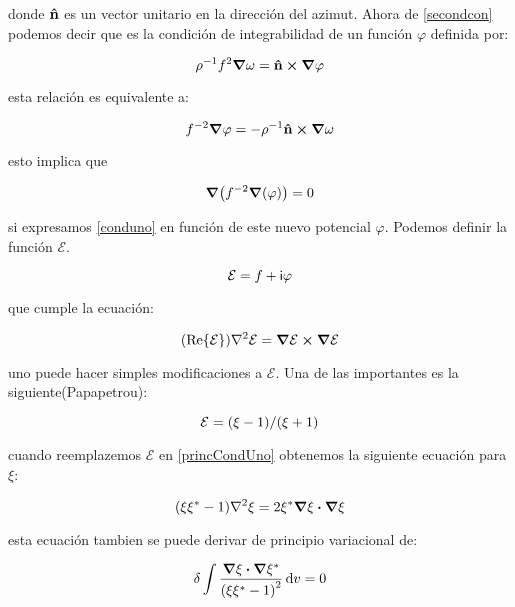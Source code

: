 \documentclass[../Main.tex]{subfiles}
\begin{document}
donde $\vu{n}$ es un vector unitario en la dirección del azimut. Ahora de \eqref{secondcon} podemos decir que es la condición de integrabilidad de un función $\varphi$ definida por:

\begin{equation}
    \rho^{-1}f^{2}\grad{\omega}=\vu{n}\cp\grad{\varphi}
\end{equation}

esta relación es equivalente a:

\begin{equation}
    f^{-2}\grad{\varphi}=-\rho^{-1}\vu{n}\cp\grad{\omega}
\end{equation}

esto implica que

\begin{equation}
    \grad(f^{-2}\grad(\varphi))=0
\end{equation}

si expresamos \eqref{conduno} en función de este nuevo potencial $\varphi$. Podemos definir la función $\mathcal{E}$.

\begin{equation}
    \mathcal{E}=f+\mathsf{i} \varphi
\end{equation}

que cumple la ecuación:

\begin{equation}
    \qty(\Re{\mathcal{E}})\laplacian{\mathcal{E}}=\grad{\mathcal{E}}\cp\grad{\mathcal{E}}
\label{princCondUno}
\end{equation}

uno puede hacer simples modificaciones a $\mathcal{E}$. Una de las importantes es la siguiente(Papapetrou):

\begin{equation}
    \mathcal{E}=\qty(\xi-1)/\qty(\xi+1)
    \label{Eecu}
\end{equation}

cuando reemplazemos $\mathcal{E}$ en \eqref{princCondUno} obtenemos la siguiente ecuación para $\xi$:

\begin{equation}
    \qty(\xi\xi^{*}-1)\laplacian{\xi}=2\xi^{*}\grad{\xi}\vdot\grad{\xi}
    \label{xiEcu}
\end{equation}

esta ecuación tambien se puede derivar de principio variacional de:

\begin{equation}
    \delta\int\dfrac{\grad{\xi}\vdot\grad{\xi}^{*}}{\qty(\xi\xi^{*}-1)^{2}}\dd{v}=0
\end{equation}
\end{document}

